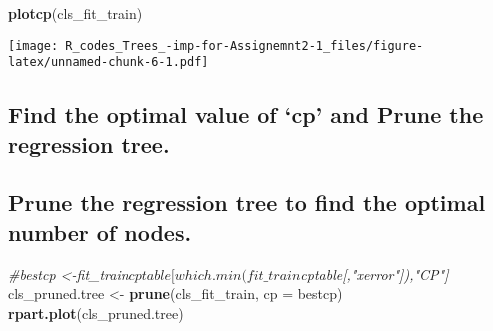 \documentclass[
]{article}
\newenvironment{Shaded}{\begin{snugshade}}{\end{snugshade}}
\newcommand{\AttributeTok}[1]{\textcolor[rgb]{0.13,0.29,0.53}{#1}}
\newcommand{\CommentTok}[1]{\textcolor[rgb]{0.56,0.35,0.01}{\textit{#1}}}
\newcommand{\DocumentationTok}[1]{\textcolor[rgb]{0.56,0.35,0.01}{\textbf{\textit{#1}}}}
\newcommand{\FunctionTok}[1]{\textcolor[rgb]{0.13,0.29,0.53}{\textbf{#1}}}
\newcommand{\NormalTok}[1]{#1}
\newcommand{\OtherTok}[1]{\textcolor[rgb]{0.56,0.35,0.01}{#1}}
\newcommand{\SpecialCharTok}[1]{\textcolor[rgb]{0.81,0.36,0.00}{\textbf{#1}}}
\newcommand{\StringTok}[1]{\textcolor[rgb]{0.31,0.60,0.02}{#1}}
\begin{document}
\begin{Shaded}
\begin{Highlighting}[]
\FunctionTok{plotcp}\NormalTok{(cls\_fit\_train) }
\end{Highlighting}
\end{Shaded}

\texttt{[image: R\_codes\_Trees\_-imp-for-Assignemnt2-1\_files/figure-latex/unnamed-chunk-6-1.pdf]}

\hypertarget{section}{%
\subsubsection{}\label{section}}

\hypertarget{find-the-optimal-value-of-cp-and-prune-the-regression-tree.}{%
\subsection{Find the optimal value of `cp' and Prune the regression
tree.}\label{find-the-optimal-value-of-cp-and-prune-the-regression-tree.}}

\begin{Shaded}
\end{Shaded}

\hypertarget{section-1}{%
\subsubsection{}\label{section-1}}

\hypertarget{prune-the-regression-tree-to-find-the-optimal-number-of-nodes.}{%
\subsection{Prune the regression tree to find the optimal number of
nodes.}\label{prune-the-regression-tree-to-find-the-optimal-number-of-nodes.}}

\begin{Shaded}
\begin{Highlighting}[]
\CommentTok{\#bestcp \textless{}{-}fit\_train$cptable[which.min(fit\_train$cptable[,"xerror"]),"CP"]}
\NormalTok{cls\_pruned.tree }\OtherTok{\textless{}{-}} \FunctionTok{prune}\NormalTok{(cls\_fit\_train, }\AttributeTok{cp =}\NormalTok{ bestcp)}
\FunctionTok{rpart.plot}\NormalTok{(cls\_pruned.tree)}
\end{Highlighting}
\end{Shaded}
\end{document}

